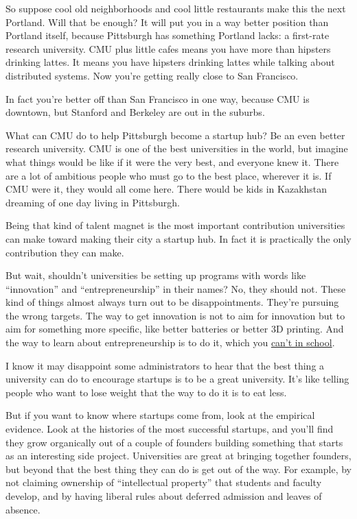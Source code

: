 So suppose cool old neighborhoods and cool little restaurants make this
the next Portland. Will that be enough? It will put you in a way better
position than Portland itself, because Pittsburgh has something Portland
lacks: a first-rate research university. CMU plus little cafes means you
have more than hipsters drinking lattes. It means you have hipsters
drinking lattes while talking about distributed systems. Now you're
getting really close to San Francisco.

In fact you're better off than San Francisco in one way, because CMU is
downtown, but Stanford and Berkeley are out in the suburbs.

What can CMU do to help Pittsburgh become a startup hub? Be an even
better research university. CMU is one of the best universities in the
world, but imagine what things would be like if it were the very best,
and everyone knew it. There are a lot of ambitious people who must go to
the best place, wherever it is. If CMU were it, they would all come
here. There would be kids in Kazakhstan dreaming of one day living in
Pittsburgh.

Being that kind of talent magnet is the most important contribution
universities can make toward making their city a startup hub. In fact it
is practically the only contribution they can make.

But wait, shouldn't universities be setting up programs with words like
``innovation'' and ``entrepreneurship'' in their names? No, they should
not. These kind of things almost always turn out to be disappointments.
They're pursuing the wrong targets. The way to get innovation is not to
aim for innovation but to aim for something more specific, like better
batteries or better 3D printing. And the way to learn about
entrepreneurship is to do it, which you \href{before.html}{can't in
school}.

I know it may disappoint some administrators to hear that the best thing
a university can do to encourage startups is to be a great university.
It's like telling people who want to lose weight that the way to do it
is to eat less.

But if you want to know where startups come from, look at the empirical
evidence. Look at the histories of the most successful startups, and
you'll find they grow organically out of a couple of founders building
something that starts as an interesting side project. Universities are
great at bringing together founders, but beyond that the best thing they
can do is get out of the way. For example, by not claiming ownership of
``intellectual property'' that students and faculty develop, and by
having liberal rules about deferred admission and leaves of absence.


